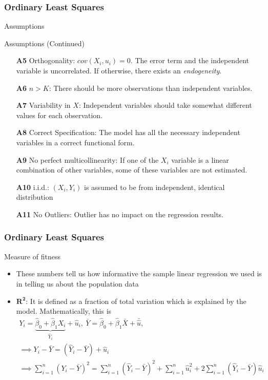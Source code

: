 \documentclass[compress]{beamer}
\begin{document}
\begin{frame}
\frametitle{Ordinary Least Squares}
Assumptions
\begin{block}{Assumptions (Continued)}
\begin{itemize}
\item[\textbf{A5}] Orthogonality: $cov(X_i,u_i)=0$. The error term and the independent variable is uncorrelated. If otherwise, there exists an \textit{endogeneity}.

\item[\textbf{A6}] $n>K$: There should be more observations than independent variables.
\item[\textbf{A7}] Variability in $X$: Independent variables should take somewhat different values for each observation. 
\item[\textbf{A8}] Correct Specification: The model has all the necessary independent variables in a correct functional form.
\item[\textbf{A9}] No perfect multicollinearity: If one of the $X_i$ variable is a linear combination of other variables, some of these variables are not estimated.
\item[\textbf{A10}] i.i.d.: $(X_i,Y_i)$ is assumed to be from independent, identical distribution

\item[\textbf{A11}] No Outliers: Outlier has no impact on the regression results.

\end{itemize}
\end{block}
\end{frame}

\begin{frame}
\frametitle{Ordinary Least Squares}
Measure of fitness
\begin{itemize}
\item These numbers tell us how informative the sample linear regression we used is in telling us about the population data
\item $\mathbf{R^2}$: It is defined as a fraction of total variation which is explained by the model. Mathematically, this is
\begin{gather*}
Y_i = \underbrace{\hat{\beta}_0 + \hat{\beta}_1X_i}_{\hat{Y}_i} + \hat{u}_i, \ \bar{Y} = \hat{\beta}_0 + \hat{\beta}_1\bar{X} + \bar{\hat{u}}, \\
\implies Y_i-\bar{Y} = (\hat{Y}_i - \bar{Y}) + \hat{u}_i \\
\implies \sum_{i=1}^n (Y_i-\bar{Y})^2= \sum_{i=1}^n (\hat{Y}_i - \bar{Y})^2+\sum_{i=1}^n\hat{u}_i^2 + 2\sum_{i=1}^n(\hat{Y}_i - \bar{Y}) \hat{u}_i
\end{gather*}
\end{itemize}
\end{frame}
\end{document}

